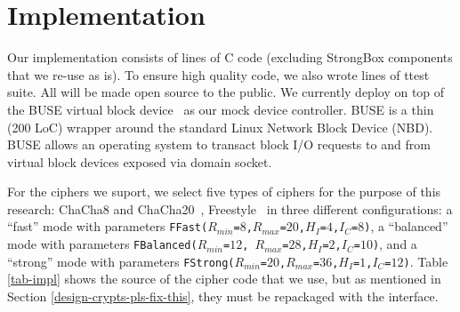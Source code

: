 

\section{Implementation} \label{subsec:implementation}




Our \sys implementation consists of \locTotal lines of C code (excluding
StrongBox components that we re-use as is).  To ensure high quality code,
we also wrote \locTest lines of ttest suite.  All will be made open source
to the public.  We currently deploy \sys on top of the BUSE virtual block
device~\cite{BUSE} as our mock device controller.  BUSE is a thin (200
LoC) wrapper around the standard Linux Network Block Device (NBD).  BUSE
allows an operating system to transact block I/O requests to and from
virtual block devices exposed via domain socket.

For the ciphers we suport, we select five types of ciphers for the purpose
of this research: ChaCha8 and ChaCha20~\cite{ChaCha20},
Freestyle~\cite{Freestyle} in three different configurations: a ``fast''
mode with parameters
\texttt{FFast($R_{min}$=$8$,$R_{max}$=$20$,$H_I$=$4$,$I_C$=$8$)}, a
``balanced'' mode with parameters \texttt{FBalanced($R_{min}$=$12$,
  $R_{max}$=$28$,$H_I$=$2$,$I_C$=$10$)}, and a ``strong'' mode with
parameters
\texttt{FStrong($R_{min}$=$20$,$R_{max}$=$36$,$H_I$=$1$,$I_C$=$12$)}.
%
%
Table \ref{tab-impl} shows the source of the cipher code that we use, but
as mentioned in Section \ref{design-crypts-pls-fix-this}, they must be
repackaged with the \sysB interface.

